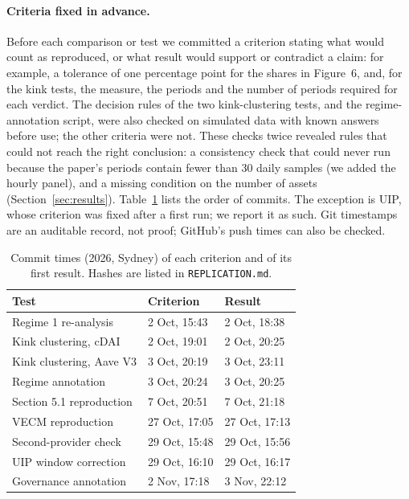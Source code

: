 \documentclass[11pt]{article}
\begin{document}
\paragraph{Criteria fixed in advance.} Before each comparison or test we committed a criterion stating what would count as reproduced, or what result would support or contradict a claim: for example, a tolerance of one percentage point for the shares in Figure~6, and, for the kink tests, the measure, the periods and the number of periods required for each verdict. The decision rules of the two kink-clustering tests, and the regime-annotation script, were also checked on simulated data with known answers before use; the other criteria were not. These checks twice revealed rules that could not reach the right conclusion: a consistency check that could never run because the paper's periods contain fewer than 30 daily samples (we added the hourly panel), and a missing condition on the number of assets (Section~\ref{sec:results}). Table~\ref{tab:prereg} lists the order of commits. The exception is UIP, whose criterion was fixed after a first run; we report it as such. Git timestamps are an auditable record, not proof; GitHub's push times can also be checked.

\begin{table}[t]
\centering\small
\setlength{\tabcolsep}{3pt}
\begin{tabular}{@{}lll@{}}
\toprule
Test & Criterion & Result \\
\midrule
Regime 1 re-analysis & 2 Oct, 15:43 & 2 Oct, 18:38 \\
Kink clustering, cDAI & 2 Oct, 19:01 & 2 Oct, 20:25 \\
Kink clustering, Aave V3 & 3 Oct, 20:19 & 3 Oct, 23:11 \\
Regime annotation & 3 Oct, 20:24 & 3 Oct, 20:25 \\
Section 5.1 reproduction & 7 Oct, 20:51 & 7 Oct, 21:18 \\
VECM reproduction & 27 Oct, 17:05 & 27 Oct, 17:13 \\
Second-provider check & 29 Oct, 15:48 & 29 Oct, 15:56 \\
UIP window correction & 29 Oct, 16:10 & 29 Oct, 16:17 \\
Governance annotation & 2 Nov, 17:18 & 3 Nov, 22:12 \\
\bottomrule
\end{tabular}
\caption{Commit times (2026, Sydney) of each criterion and of its first result. Hashes are listed in \texttt{REPLICATION.md}.}
\label{tab:prereg}
\end{table}
\end{document}
